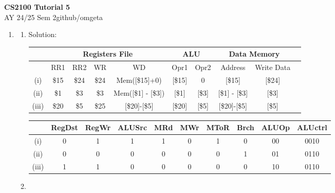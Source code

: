 \documentclass[12pt, a4paper]{article}
\newcommand{\mytitle}{CS2100 Tutorial 5}
\newcommand{\myauthor}{github/omgeta}
\newcommand{\mydate}{AY 24/25 Sem 2}
\begin{document}
\raggedright
\footnotesize
\begin{center}
{\normalsize{\textbf{\mytitle}}} \\
{\footnotesize{\mydate\hspace{2pt}\textemdash\hspace{2pt}\myauthor}}
\end{center}
\begin{enumerate}[Q\arabic*.]
  \item 
    \begin{enumerate}[(\alph*.)]
      \item Solution: 
        \begin{table}[h]
            \centering
            \begin{tabular}{|c|c|c|c|c|c|c|c|c|c|}
                \hline
                &\multicolumn{4}{|c|}{\textbf{Registers File}} & \multicolumn{2}{c|}{\textbf{ALU}} & \multicolumn{2}{c|}{\textbf{Data Memory}} \\
                \hline
                &RR1 & RR2 & WR & WD & Opr1 & Opr2 & Address & Write Data \\
                \hline
                (i)& \$15 & \$24 & \$24 & Mem([\$15]+0) & [\$15] & 0 & [\$15] & [\$24] \\
                \hline
                (ii)& \$1 & \$3 & \$3 & Mem([\$1] - [\$3])& [\$1]& [\$3]& [\$1] - [\$3]& [\$3]\\
                \hline
                (iii)& \$20& \$5& \$25& [\$20]-[\$5]& [\$20]& [\$5]& [\$20]-[\$5]& [\$5]\\
                \hline
            \end{tabular}
        \end{table}

        \begin{table}[h]
            \centering
            \begin{tabular}{|c|c|c|c|c|c|c|c|c|c|}
                \hline
                &\textbf{RegDst} & \textbf{RegWr} & \textbf{ALUSrc} & \textbf{MRd} & \textbf{MWr} & \textbf{MToR} & \textbf{Brch} & \textbf{ALUOp} & \textbf{ALUctrl} \\
                \hline
              (i)& 0 & 1 & 1 & 1 & 0 & 1 & 0 & 00 & 0010 \\
                \hline
              (ii)& 0& 0& 0& 0& 0& 0& 1& 01& 0110\\
                \hline
              (iii)& 1& 1& 0& 0& 0& 0& 0& 10& 0110\\
                \hline
            \end{tabular}
        \end{table}
      \item 
    \end{enumerate}


\end{enumerate}
\end{document}
